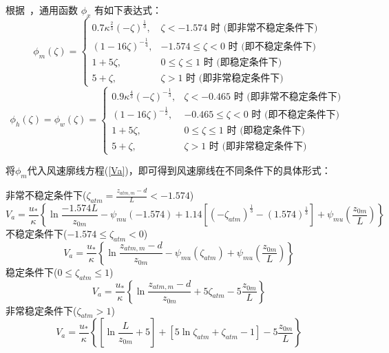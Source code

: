 根据~\citet{zeng1998intercomparison}，通用函数 $\phi_x$ 有如下表达式：
\begin{equation}\label{phim_zeng}
   \phi_{m}(\zeta)=\begin{cases}
     0.7 \kappa^{\frac{2}{3}}(-\zeta)^{\frac{1}{3}}, & \zeta<-1.574 \text { 时 (即非常不稳定条件下) } \\
     (1-16 \zeta)^{-\frac{1}{4}}, & -1.574 \leq \zeta<0 \text { 时 (即不稳定条件下) } \\
     1+5 \zeta, & 0 \leq \zeta \leq 1 \text { 时 (即稳定条件下) } \\ 
     5+\zeta, & \zeta>1 \text { 时 (即非常稳定条件下) }
   \end{cases}
\end{equation}
\begin{equation}
  \phi_{h}(\zeta)=\phi_{w}(\zeta)=\begin{cases}
     0.9 \kappa^{\frac{4}{3}}(-\zeta)^{-\frac{1}{3}}, & \zeta<-0.465 \text { 时 (即非常不稳定条件下) } \\ 
     (1-16 \zeta)^{-\frac{1}{2}}, & -0.465 \leq \zeta<0 \text { 时 (即不稳定条件下) } \\ 
     1+5 \zeta, & 0 \leq \zeta \leq 1 \text { 时 (即稳定条件下) } \\
     5+\zeta, & \zeta>1 \text { 时 (即非常稳定条件下) }
   \end{cases}
\end{equation}

将$\phi_m$代入风速廓线方程(\ref{Va})，即可得到风速廓线在不同条件下的具体形式：

\noindent 非常不稳定条件下($\zeta_{atm}=\frac{z_{atm,m}-d}{L}<-1.574$)
\begin{equation}\label{Va_VU}
V_{a}=\frac{u_{*}}{\kappa}\left\{\ln \frac{-1.574 L}{z_{0 m}}-\psi_{mu}(-1.574)+
1.14\left[\left(-\zeta_{atm}\right)^{\frac{1}{3}}-(1.574)^{\frac{1}{3}}\right]+\psi_{mu}\left(\frac{z_{0 m}}{L}\right)\right\}
\end{equation}
不稳定条件下($-1.574\le\zeta_{atm}<0$)
\begin{equation}\label{Va_U}
V_{a}=\frac{u_{*}}{\kappa}\left\{\ln \frac{z_{atm, m}-d}{z_{0 m}}-\psi_{mu}\left(\zeta_{atm}\right)+\psi_{mu}\left(\frac{z_{0 m}}{L}\right)\right\}
\end{equation}
稳定条件下($0\le\zeta_{atm}\le1$)
\begin{equation}\label{Va_S}
V_{a}=\frac{u_{*}}{\kappa}\left\{\ln \frac{z_{atm, m}-d}{z_{0 m}}+5 \zeta_{atm}-5 \frac{z_{0 m}}{L}\right\}
\end{equation}
非常稳定条件下($\zeta_{atm}>1$)
\begin{equation}\label{Va_VS}
V_{a}=\frac{u_{*}}{\kappa}\left\{\left[\ln \frac{L}{z_{0 m}}+5\right]+\left[5 \ln \zeta_{atm}+\zeta_{atm}-1\right]-5 \frac{z_{0 m}}{L}\right\}
\end{equation}

